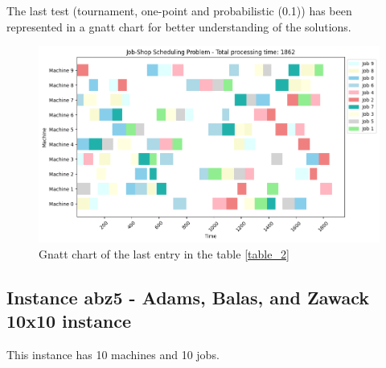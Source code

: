 \documentclass[11pt, a4paper]{article}
\begin{document}
The last test (tournament, one-point and probabilistic (0.1)) has been represented in a gnatt chart for better understanding of the solutions.

\begin{figure}[H]
    \centering
    \includegraphics[width=\textwidth]{media/results_abz5.png}
    \caption{Gnatt chart of the last entry in the table \ref{table_2}}
    \label{fig:image_13}
\end{figure}

\subsection{Instance abz5 - Adams, Balas, and Zawack 10x10 instance}

This instance has 10 machines and 10 jobs.
\end{document}
